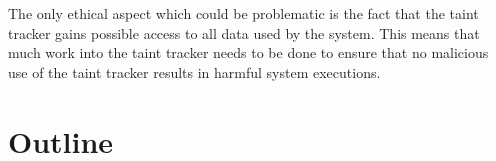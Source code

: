 The only ethical aspect which could be problematic is the fact that the taint tracker gains possible access to all data used by the system. This means that much work into the taint tracker needs to be done to ensure that no malicious use of the taint tracker results in harmful system executions.



\section{Outline}
\label{Structure}
